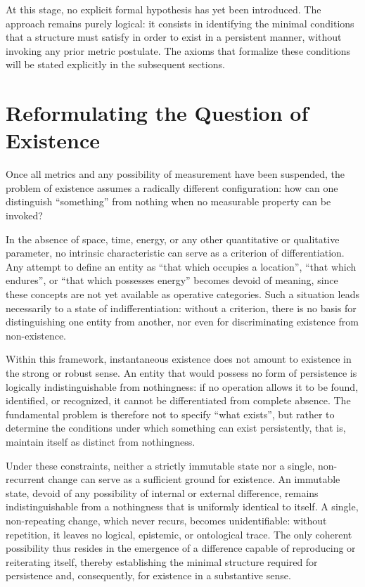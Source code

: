 \documentclass[11pt,a4paper]{article}
\begin{document}
At this stage, no explicit formal hypothesis has yet been introduced. The approach remains purely logical: it consists in identifying the minimal conditions that a structure must satisfy in order to exist in a persistent manner, without invoking any prior metric postulate. The axioms that formalize these conditions will be stated explicitly in the subsequent sections.

\section{Reformulating the Question of Existence}

Once all metrics and any possibility of measurement have been suspended, the problem of existence assumes a radically different configuration: how can one distinguish “something” from nothing when no measurable property can be invoked?

In the absence of space, time, energy, or any other quantitative or qualitative parameter, no intrinsic characteristic can serve as a criterion of differentiation. Any attempt to define an entity as “that which occupies a location”, “that which endures”, or “that which possesses energy” becomes devoid of meaning, since these concepts are not yet available as operative categories. Such a situation leads necessarily to a state of indifferentiation: without a criterion, there is no basis for distinguishing one entity from another, nor even for discriminating existence from non-existence.

Within this framework, instantaneous existence does not amount to existence in the strong or robust sense. An entity that would possess no form of persistence is logically indistinguishable from nothingness: if no operation allows it to be found, identified, or recognized, it cannot be differentiated from complete absence. The fundamental problem is therefore not to specify “what exists”, but rather to determine the conditions under which something can exist persistently, that is, maintain itself as distinct from nothingness.

Under these constraints, neither a strictly immutable state nor a single, non-recurrent change can serve as a sufficient ground for existence. An immutable state, devoid of any possibility of internal or external difference, remains indistinguishable from a nothingness that is uniformly identical to itself. A single, non-repeating change, which never recurs, becomes unidentifiable: without repetition, it leaves no logical, epistemic, or ontological trace. The only coherent possibility thus resides in the emergence of a difference capable of reproducing or reiterating itself, thereby establishing the minimal structure required for persistence and, consequently, for existence in a substantive sense.
\end{document}

